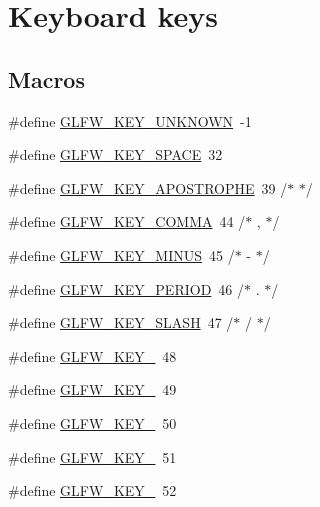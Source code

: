 \hypertarget{group__keys}{}\section{Keyboard keys}
\label{group__keys}
\subsection*{Macros}
\begin{DoxyCompactItemize}
\item 
\#define \hyperlink{group__keys_ga99aacc875b6b27a072552631e13775c7}{G\+L\+F\+W\+\_\+\+K\+E\+Y\+\_\+\+U\+N\+K\+N\+O\+W\+N}~-\/1
\item 
\#define \hyperlink{group__keys_gaddb2c23772b97fd7e26e8ee66f1ad014}{G\+L\+F\+W\+\_\+\+K\+E\+Y\+\_\+\+S\+P\+A\+C\+E}~32
\item 
\#define \hyperlink{group__keys_ga6059b0b048ba6980b6107fffbd3b4b24}{G\+L\+F\+W\+\_\+\+K\+E\+Y\+\_\+\+A\+P\+O\+S\+T\+R\+O\+P\+H\+E}~39  /$\ast$ \textquotesingle{} $\ast$/
\item 
\#define \hyperlink{group__keys_gab3d5d72e59d3055f494627b0a524926c}{G\+L\+F\+W\+\_\+\+K\+E\+Y\+\_\+\+C\+O\+M\+M\+A}~44  /$\ast$ , $\ast$/
\item 
\#define \hyperlink{group__keys_gac556b360f7f6fca4b70ba0aecf313fd4}{G\+L\+F\+W\+\_\+\+K\+E\+Y\+\_\+\+M\+I\+N\+U\+S}~45  /$\ast$ -\/ $\ast$/
\item 
\#define \hyperlink{group__keys_ga37e296b650eab419fc474ff69033d927}{G\+L\+F\+W\+\_\+\+K\+E\+Y\+\_\+\+P\+E\+R\+I\+O\+D}~46  /$\ast$ . $\ast$/
\item 
\#define \hyperlink{group__keys_gadf3d753b2d479148d711de34b83fd0db}{G\+L\+F\+W\+\_\+\+K\+E\+Y\+\_\+\+S\+L\+A\+S\+H}~47  /$\ast$ / $\ast$/
\item 
\#define \hyperlink{group__keys_ga50391730e9d7112ad4fd42d0bd1597c1}{G\+L\+F\+W\+\_\+\+K\+E\+Y\+\_}~48
\item 
\#define \hyperlink{group__keys_ga05e4cae9ddb8d40cf6d82c8f11f2502f}{G\+L\+F\+W\+\_\+\+K\+E\+Y\+\_}~49
\item 
\#define \hyperlink{group__keys_gadc8e66b3a4c4b5c39ad1305cf852863c}{G\+L\+F\+W\+\_\+\+K\+E\+Y\+\_}~50
\item 
\#define \hyperlink{group__keys_ga812f0273fe1a981e1fa002ae73e92271}{G\+L\+F\+W\+\_\+\+K\+E\+Y\+\_}~51
\item 
\#define \hyperlink{group__keys_ga9e14b6975a9cc8f66cdd5cb3d3861356}{G\+L\+F\+W\+\_\+\+K\+E\+Y\+\_}~52
\item 

\end{DoxyCompactItemize}
